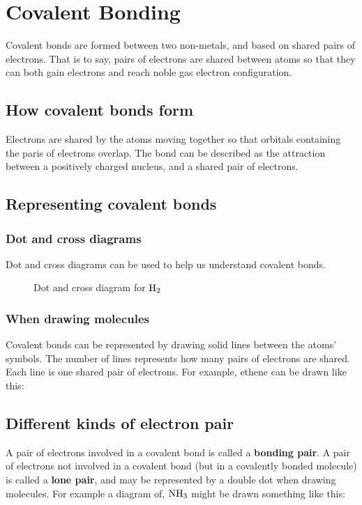 \section{Covalent Bonding}
Covalent bonds are formed between two non-metals, and based on shared pairs of electrons. That is to say, pairs of electrons are shared between atoms so that they can both gain electrons and reach noble gas electron configuration.

\subsection{How covalent bonds form}
Electrons are shared by the atoms moving together so that orbitals containing the paris of electrons overlap. The bond can be described as the attraction between a positively charged nucleus, and a shared pair of electrons.

\subsection{Representing covalent bonds}
\subsubsection{Dot and cross diagrams}
Dot and cross diagrams can be used to help us understand covalent bonds.
\begin{figure}[ht]
    \centering
	\caption{Dot and cross diagram for $\ce{H2}$}
    \label{fig:dot-and-cross-diagram-for-h2}
\end{figure}
\subsubsection{When drawing molecules}
Covalent bonds can be represented by drawing solid lines between the atoms' symbols. The number of lines represents how many pairs of electrons are shared. Each line is one shared pair of electrons. For example, ethene can be drawn like this:\\
\begin{center}
\end{center}

\subsection{Different kinds of electron pair}
A pair of electrons involved in a covalent bond is called a \textbf{bonding pair}. A pair of electrons not involved in a covalent bond (but in a covalently bonded molecule) is called a \textbf{lone pair}, and may be represented by a double dot when drawing molecules. For example a diagram of, $\ce{NH3}$ might be drawn something like this:
\begin{center}
\end{center}

